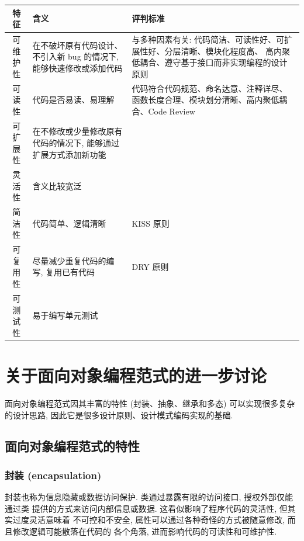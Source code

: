 \documentclass[10pt,UTF8]{book} %
\begin{document}
{ %
\label{代码质量的评判标准} %
\begin{longtable}{cp{}p{}}
    \toprule
    \textbf{特征} & \textbf{含义} & \textbf{评判标准} \\
    \midrule
    \endhead
    \bottomrule
    \endfoot

    可维护性 
    & 在不破坏原有代码设计、不引入新 bug 的情况下, 能够快速修改或添加代码 
    & 与多种因素有关: 代码简洁、可读性好、可扩展性好、分层清晰、模块化程度高、
    高内聚低耦合、遵守基于接口而非实现编程的设计原则 \\
    可读性
    & 代码是否易读、易理解
    & 代码符合代码规范、命名达意、注释详尽、函数长度合理、模块划分清晰、高内聚低耦合、Code Review \\ 
    可扩展性
    & 在不修改或少量修改原有代码的情况下, 能够通过扩展方式添加新功能
    & \\ 
    灵活性 & 含义比较宽泛 & \\ 
    简洁性 & 代码简单、逻辑清晰 & KISS 原则 \\ 
    可复用性 & 尽量减少重复代码的编写, 复用已有代码 & DRY 原则 \\ 
    可测试性 & 易于编写单元测试 & \\
\end{longtable}}

\section{关于面向对象编程范式的进一步讨论}

面向对象编程范式因其丰富的特性 (封装、抽象、继承和多态) 可以实现很多复杂的设计思路,
因此它是很多设计原则、设计模式编码实现的基础.

\subsection{面向对象编程范式的特性}

\subsubsection{封装 (encapsulation)}
 
封装也称为信息隐藏或数据访问保护. 类通过暴露有限的访问接口, 授权外部仅能通过类
提供的方式来访问内部信息或数据. 这看似影响了程序代码的灵活性, 但其实过度灵活意味着
不可控和不安全, 属性可以通过各种奇怪的方式被随意修改, 而且修改逻辑可能散落在代码的
各个角落, 进而影响代码的可读性和可维护性.
\end{document}
